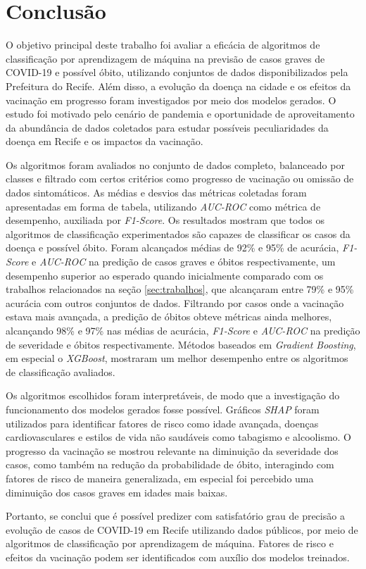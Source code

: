 \chapter{Conclusão}
\label{chap:conclusao}

O objetivo principal deste trabalho foi avaliar a eficácia de algoritmos de classificação por aprendizagem de máquina na previsão de casos graves de COVID-19 e possível óbito, utilizando conjuntos de dados disponibilizados pela Prefeitura do Recife. Além disso, a evolução da doença na cidade e os efeitos da vacinação em progresso foram investigados por meio dos modelos gerados. O estudo foi motivado pelo cenário de pandemia e oportunidade de aproveitamento da abundância de dados coletados para estudar possíveis peculiaridades da doença em Recife e os impactos da vacinação.

Os algoritmos foram avaliados no conjunto de dados completo, balanceado por classes e filtrado com certos critérios como progresso de vacinação ou omissão de dados sintomáticos. As médias e desvios das métricas coletadas foram apresentadas em forma de tabela, utilizando \textit{AUC-ROC} como métrica de desempenho, auxiliada por \textit{F1-Score}. Os resultados mostram que todos os algoritmos de classificação experimentados são capazes de classificar os casos da doença e possível óbito. Foram alcançados médias de 92\% e 95\% de acurácia, \textit{F1-Score} e \textit{AUC-ROC} na predição de casos graves e óbitos respectivamente, um desempenho superior ao esperado quando inicialmente comparado com os trabalhos relacionados na seção \ref{sec:trabalhos}, que alcançaram entre 79\% e 95\% acurácia com outros conjuntos de dados. Filtrando por casos onde a vacinação estava mais avançada, a predição de óbitos obteve métricas ainda melhores, alcançando 98\% e 97\% nas médias de acurácia, \textit{F1-Score} e \textit{AUC-ROC} na predição de severidade e óbitos respectivamente. Métodos baseados em \textit{Gradient Boosting}, em especial o \textit{XGBoost}, mostraram um melhor desempenho entre os algoritmos de classificação avaliados.

Os algoritmos escolhidos foram interpretáveis, de modo que a investigação do funcionamento dos modelos gerados fosse possível. Gráficos \textit{SHAP} foram utilizados para identificar fatores de risco como idade avançada, doenças cardiovasculares e estilos de vida não saudáveis como tabagismo e alcoolismo. O progresso da vacinação se mostrou relevante na diminuição da severidade dos casos, como também na redução da probabilidade de óbito, interagindo com fatores de risco de maneira generalizada, em especial foi percebido uma diminuição dos casos graves em idades mais baixas.

Portanto, se conclui que é possível predizer com satisfatório grau de precisão a evolução de casos de COVID-19 em Recife utilizando dados públicos, por meio de algoritmos de classificação por aprendizagem de máquina. Fatores de risco e efeitos da vacinação podem ser identificados com auxílio dos modelos treinados.


